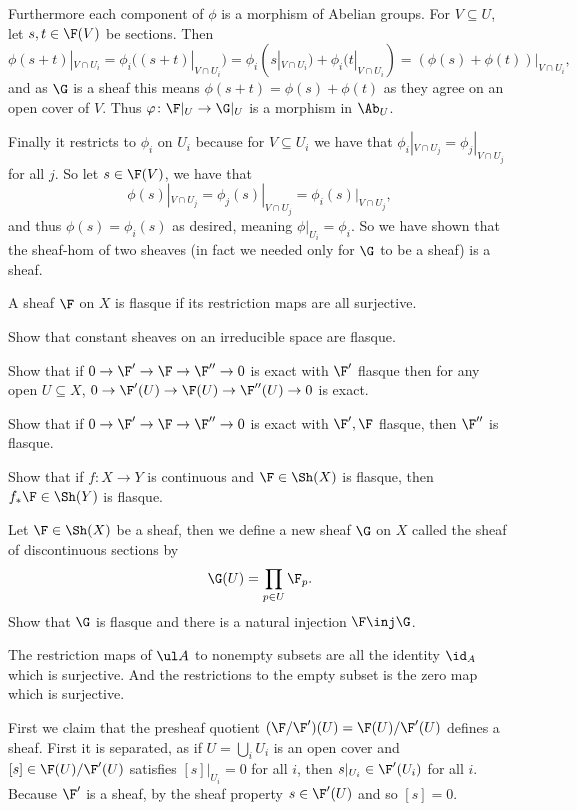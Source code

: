 Furthermore each component of $\phi$ is a morphism of Abelian groups.
For $V\subseteq U$, let $s,t\in\F(V)$ be sections.
Then
$$ \phi(s+t)|_{V\cap U_i} = \phi_i((s+t)|_{V\cap U_i}) = \phi_i(s|_{V\cap U_i}) + \phi_i(t|_{V\cap U_i}) = (\phi(s) + \phi(t))|_{V\cap U_i} , $$
and as $\G$ is a sheaf this means $\phi(s+t)=\phi(s)+\phi(t)$ as they agree on an open cover of $V$.
Thus $\phi\colon\F|_U\to\G|_U$ is a morphism in $\Ab_U$.

Finally it restricts to $\phi_i$ on $U_i$ because for $V\subseteq U_i$ we have that $\phi_i|_{V\cap U_j}=\phi_j|_{V\cap U_j}$ for all $j$.
So let $s\in\F(V)$, we have that
$$ \phi(s)|_{V\cap U_j} = \phi_j(s)|_{V\cap U_j} = \phi_i(s)|_{V\cap U_j} , $$
and thus $\phi(s)=\phi_i(s)$ as desired, meaning $\phi|_{U_i}=\phi_i$.
So we have shown that the sheaf-hom of two sheaves (in fact we needed only for $\G$ to be a sheaf) is a sheaf.

\bprob[title={Hartshorne II.1.16}, name={flasque}]

    A sheaf $\F$ on $X$ is {\emphcolor flasque} if its restriction maps are all surjective.
    \benum
        \item Show that constant sheaves on an irreducible space are flasque.
        \item Show that if $0\to\F'\to\F\to\F''\to0$ is exact with $\F'$ flasque then for any open $U\subseteq X$,
        $0\to\F'(U)\to\F(U)\to\F''(U)\to0$ is exact.
        \item Show that if $0\to\F'\to\F\to\F''\to0$ is exact with $\F',\F$ flasque, then $\F''$ is flasque.
        \item Show that if $f\colon X\to Y$ is continuous and $\F\in\Sh(X)$ is flasque, then $f_*\F\in\Sh(Y)$ is flasque.
        \item Let $\F\in\Sh(X)$ be a sheaf, then we define a new sheaf $\G$ on $X$ called the {\emphcolor sheaf of discontinuous sections} by
        $$ \G(U) = \prod_{p\in U}\F_p . $$
        Show that $\G$ is flasque and there is a natural injection $\F\inj\G$.
    \eenum

\eprob

\benum
    \item The restriction maps of $\ul A$ to nonempty subsets are all the identity $\id_A$ which is surjective.
    And the restrictions to the empty subset is the zero map which is surjective.

    \item First we claim that the presheaf quotient $(\F/\F')(U)=\F(U)/\F'(U)$ defines a sheaf.
    First it is separated, as if $U=\bigcup_iU_i$ is an open cover and $[s]\in\F(U)/\F'(U)$ satisfies $[s]|_{U_i}=0$ for all $i$, then
    $s|_{U_i}\in\F'(U_i)$ for all $i$.
    Because $\F'$ is a sheaf, by the sheaf property $s\in\F'(U)$ and so $[s]=0$.

